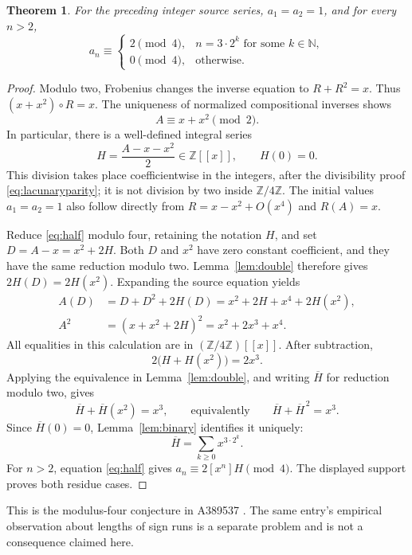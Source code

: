 \documentclass[11pt,a4paper]{article}
\newtheorem{theorem}{Theorem}[section]
\theoremstyle{remark}
\newcommand{\Z}{\mathbb Z}
\newcommand{\N}{\mathbb N}
\newcommand{\ps}[1]{#1[[x]]}
\begin{document}
\begin{theorem}\label{thm:lacunary}
For the preceding integer source series, $a_1=a_2=1$, and for every $n>2$,
\[
 a_n\equiv
 \begin{cases}
  2\pmod4,&n=3\cdot2^k\text{ for some }k\in\N,\\
  0\pmod4,&\text{otherwise}.
 \end{cases}
\]
\end{theorem}

\begin{proof}
Modulo two, Frobenius changes the inverse equation to $R+R^2=x$.
Thus $(x+x^2)\circ R=x$. The uniqueness of normalized compositional
inverses shows
\begin{equation}\label{eq:lacunaryparity}
 A\equiv x+x^2\pmod2.
\end{equation}
In particular, there is a well-defined integral series
\begin{equation}\label{eq:half}
 H=\frac{A-x-x^2}{2}\in\ps{\Z},\qquad H(0)=0.
\end{equation}
This division takes place coefficientwise in the integers, after the
divisibility proof \eqref{eq:lacunaryparity}; it is not division by two
inside $\Z/4\Z$. The initial values $a_1=a_2=1$ also follow directly
from $R=x-x^2+O(x^4)$ and $R(A)=x$.

Reduce \eqref{eq:half} modulo four, retaining the notation $H$, and set
$D=A-x=x^2+2H$. Both $D$ and $x^2$ have zero constant coefficient,
and they have the same reduction modulo two. Lemma~\ref{lem:double}
therefore gives $2H(D)=2H(x^2)$. Expanding the source equation yields
\begin{align*}
 A(D)&=D+D^2+2H(D)
       =x^2+2H+x^4+2H(x^2),\\
 A^2&=(x+x^2+2H)^2=x^2+2x^3+x^4.
\end{align*}
All equalities in this calculation are in $(\Z/4\Z)[[x]]$.
After subtraction,
\[
 2\bigl(H+H(x^2)\bigr)=2x^3.
\]
Applying the equivalence in Lemma~\ref{lem:double}, and writing
$\overline H$ for reduction modulo two, gives
\[
 \overline H+\overline H(x^2)=x^3,
 \qquad\text{equivalently}\qquad
 \overline H+\overline H^{\,2}=x^3.
\]
Since $\overline H(0)=0$, Lemma~\ref{lem:binary} identifies it uniquely:
\[
 \overline H=\sum_{k\ge0}x^{3\cdot2^k}.
\]
For $n>2$, equation \eqref{eq:half} gives $a_n\equiv2[x^n]H\pmod4$.
The displayed support proves both residue cases.
\end{proof}

This is the modulus-four conjecture in A389537 \cite{oeis537}.
The same entry's empirical observation about lengths of sign runs is a
separate problem and is not a consequence claimed here.
\end{document}
